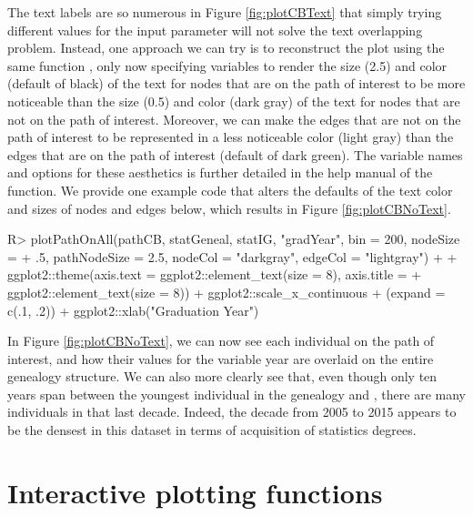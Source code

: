 \documentclass[article,shortnames]{jss}
\begin{document}
The text labels are so numerous in Figure \ref{fig:plotCBText} that simply trying different values for the input parameter  will not solve the text overlapping problem. Instead, one approach we can try is to reconstruct the plot using the same  function , only now specifying variables to render the size (2.5) and color (default of black) of the text for nodes that are on the path of interest to be more noticeable than the size (0.5) and color (dark gray) of the text for nodes that are not on the path of interest. Moreover, we can make the edges that are not on the path of interest to be represented in a less noticeable color (light gray) than the edges that are on the path of interest (default of dark green). The variable names and options for these aesthetics is further detailed in the help manual of the function. We provide one example code that alters the defaults of the text color and sizes of nodes and edges below, which results in Figure \ref{fig:plotCBNoText}.

\begin{CodeChunk}
\begin{CodeInput}
R> plotPathOnAll(pathCB, statGeneal, statIG, "gradYear", bin = 200, nodeSize =
+    .5, pathNodeSize = 2.5, nodeCol = "darkgray", edgeCol = "lightgray") +
+    ggplot2::theme(axis.text = ggplot2::element_text(size = 8), axis.title =
+    ggplot2::element_text(size = 8)) + ggplot2::scale_x_continuous
+    (expand = c(.1, .2)) + ggplot2::xlab("Graduation Year")
\end{CodeInput}
\end{CodeChunk}

In Figure \ref{fig:plotCBNoText}, we can now see each individual on the path of interest, and how their values for the variable year are overlaid on the entire genealogy structure. We can also more clearly see that, even though only ten years span between the youngest individual in the genealogy and , there are many individuals in that last decade. Indeed, the decade from 2005 to 2015 appears to be the densest in this dataset in terms of acquisition of statistics degrees.

\section{Interactive plotting functions}
\label{interaction}
\end{document}
